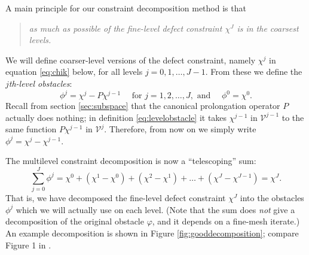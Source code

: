 \documentclass[letterpaper,final,12pt,reqno]{amsart}
\theoremstyle{claim}
\numberwithin{equation}{section}
\numberwithin{figure}{section}
\numberwithin{table}{section}
\begin{document}
A main principle for our constraint decomposition method is that
\begin{quote}
\emph{as much as possible of the fine-level defect constraint $\chi^J$ is in the coarsest levels.}
\end{quote}
We will define coarser-level versions of the defect constraint, namely $\chi^j$ in equation \eqref{eq:chik} below, for all levels $j=0,1,\dots,J-1$.  From these we define the \emph{$j$th-level obstacles}:
\begin{equation}
  \phi^j = \chi^j - P\chi^{j-1} \quad \text{ for } j=1,2,\dots,J, \text{ and } \quad \phi^0 = \chi^0.  \label{eq:levelobstacle}
\end{equation}
Recall from section \ref{sec:subspace} that the canonical prolongation operator $P$ actually does nothing; in definition \eqref{eq:levelobstacle} it takes $\chi^{j-1}$ in $\mathcal{V}^{j-1}$ to the same function $P\chi^{j-1}$ in $\mathcal{V}^j$.  Therefore, from now on we simply write $\phi^j = \chi^j - \chi^{j-1}$.

The multilevel constraint decomposition is now a ``telescoping'' sum:
\begin{equation}
  \sum_{j=0}^J \phi^j = \chi^0 + (\chi^1 - \chi^0) + (\chi^2 - \chi^1) + \dots + (\chi^J - \chi^{J-1}) = \chi^J.  \label{eq:telescopingdecomposition}
\end{equation}
That is, we have decomposed the fine-level defect constraint $\chi^J$ into the obstacles $\phi^j$ which we will actually use on each level.  (Note that the sum does \emph{not} give a decomposition of the original obstacle $\varphi$, and it depends on a fine-mesh iterate.)  An example decomposition is shown in Figure \ref{fig:gooddecomposition}; compare Figure 1 in \cite{GraeserKornhuber2009}.
\end{document}

